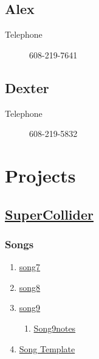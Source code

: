 \documentclass[12pt,twoside]{article}
\begin{document}
\subsection{Alex}
\label{sec:org2bcf184}
\begin{description}
\item[{Telephone}] 608-219-7641
\end{description}
\subsection{Dexter}
\label{sec:org7cbae20}
\begin{description}
\item[{Telephone}] 608-219-5832
\end{description}
\newpage
\section{Projects}
\label{sec:orgcf2b4fa}
\subsection{\href{file:///home/dbalchen/Music/SuperCollider/SuperCollider.org}{SuperCollider}}
\label{sec:org2891607}
\subsubsection{Songs}
\label{sec:orgf603432}
\begin{enumerate}
\item \href{file:///home/dbalchen/Music/song7/song7.sc}{song7}
\label{sec:org37aa87e}
\item \href{file:///home/dbalchen/Music/song8/song8.sc}{song8}
\label{sec:org842dfad}
\item \href{file:///home/dbalchen/Music/song9/song9.sc}{song9}
\label{sec:org79c3468}
\begin{enumerate}
\item \href{file:///home/dbalchen/Music/song9/song9.notes.sc}{Song9notes}
\label{sec:orgdb8c2d8}
\end{enumerate}
\item \href{../../Music/SuperCollider/include/song\_template.sc}{Song Template}
\label{sec:org0870d9b}
\end{enumerate}
\end{document}
